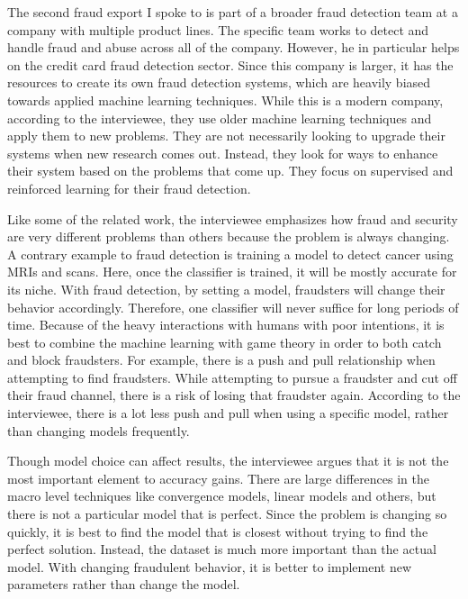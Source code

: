 \documentclass[midd]{thesis}
\begin{document}
The second fraud export I spoke to is part of a broader fraud detection team at a company with multiple product lines. The specific team works to detect and handle fraud and abuse across all of the company. However, he in particular helps on the credit card fraud detection sector. Since this company is larger, it has the resources to create its own fraud detection systems, which are heavily biased towards applied machine learning techniques. While this is a modern company, according to the interviewee, they use older machine learning techniques and apply them to new problems. They are not necessarily looking to upgrade their systems when new research comes out. Instead, they look for ways to enhance their system based on the problems that come up. They focus on supervised and reinforced learning for their fraud detection.

Like some of the related work, the interviewee emphasizes how fraud and security are very different problems than others because the problem is always changing. A contrary example to fraud detection is training a model to detect cancer using MRIs and scans. Here, once the classifier is trained, it will be mostly accurate for its niche. With fraud detection, by setting a model, fraudsters will change their behavior accordingly. Therefore, one classifier will never suffice for long periods of time. Because of the heavy interactions with humans with poor intentions, it is best to combine the machine learning with game theory in order to both catch and block fraudsters. For example, there is a push and pull relationship when attempting to find fraudsters. While attempting to pursue a fraudster and cut off their fraud channel, there is a risk of losing that fraudster again. According to the interviewee, there is a lot less push and pull when using a specific model, rather than changing models frequently.

Though model choice can affect results, the interviewee argues that it is not the most important element to accuracy gains. There are large differences in the macro level techniques like convergence models, linear models and others, but there is not a particular model that is perfect. Since the problem is changing so quickly, it is best to find the model that is closest without trying to find the perfect solution. Instead, the dataset is much more important than the actual model. With changing fraudulent behavior, it is better to implement new parameters rather than change the model. 
\end{document}
